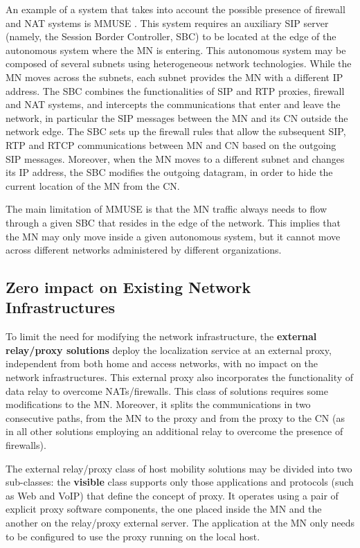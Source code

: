 \documentclass[preprint,12pt]{elsarticle}
\begin{document}
An example of a system that takes into account the possible presence of firewall and NAT systems is MMUSE \cite{SalsanoPMNV08}. 
This system requires an auxiliary SIP server (namely, the Session Border Controller, SBC) to be located at the edge of the autonomous system where the MN is entering. 
This autonomous system may be composed of several subnets using heterogeneous network technologies. While the MN moves across the subnets, each subnet provides the MN with a different IP address. 
The SBC combines the functionalities of SIP and RTP proxies, firewall and NAT systems, and intercepts the communications that enter and leave the network, in particular the SIP messages between the MN and its CN outside the network edge. 
The SBC sets up the firewall rules that allow the subsequent SIP, RTP and RTCP communications between
MN and CN based on the outgoing SIP messages. Moreover, when the MN moves to a different subnet and changes its IP address, the SBC modifies the outgoing datagram, in order to hide the current location of the MN from the CN.

The main limitation of MMUSE is that the MN traffic always needs to flow through a given SBC that resides in the edge of the network. 
This implies that the MN may only move inside a given autonomous system, but it cannot move across different networks administered by different organizations. 


\subsection{Zero impact on Existing Network Infrastructures}

To limit the need for modifying the network infrastructure, the \textbf{external relay/proxy solutions} deploy the localization service at an external proxy, independent from both home and access networks, with no impact on the network infrastructures. 
This external proxy also incorporates the functionality of data relay to overcome NATs/firewalls. 
This class of solutions requires some modifications to the MN. Moreover, it splits the communications in two consecutive paths, from the MN to the proxy and from the proxy to the CN (as in all other solutions employing an additional relay to overcome the presence of firewalls).

The external relay/proxy class of host mobility solutions may be divided into 
two sub-classes: the \textbf{visible} class supports only those applications and 
protocols (such as Web and VoIP) that define the concept of proxy. It operates 
using a pair of explicit proxy software components, the one placed inside the MN and the
another on the relay/proxy external server.  
The application at the MN only needs to be configured to use the proxy running 
on the local host. 
\end{document}
